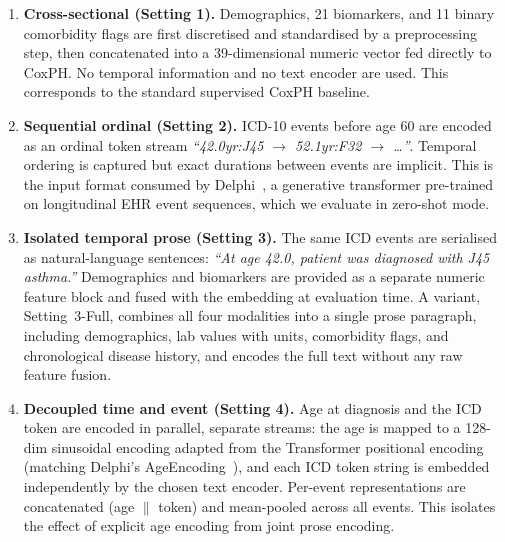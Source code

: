 \begin{enumerate}
  \item \textbf{Cross-sectional (Setting 1).}
        Demographics, 21 biomarkers, and 11 binary comorbidity flags are
        first discretised and standardised by a preprocessing step, then
        concatenated into a 39-dimensional numeric vector fed directly to CoxPH.
        No temporal information and no text encoder are used.
        This corresponds to the standard supervised CoxPH baseline.

  \item \textbf{Sequential ordinal (Setting 2).}
        ICD-10 events before age 60 are encoded as an ordinal token stream
        \textit{``42.0yr:J45 $\rightarrow$ 52.1yr:F32 $\rightarrow$ \ldots''}.
        Temporal ordering is captured but exact durations between events are
        implicit.
        This is the input format consumed by Delphi~\cite{delphi2024},
        a generative transformer pre-trained on longitudinal EHR event
        sequences, which we evaluate in zero-shot mode.

  \item \textbf{Isolated temporal prose (Setting 3).}
        The same ICD events are serialised as natural-language sentences:
        \textit{``At age 42.0, patient was diagnosed with J45 asthma.''}
        Demographics and biomarkers are provided as a separate numeric
        feature block and fused with the embedding at evaluation time.
        A variant, Setting~3-Full, combines all four modalities into a single
        prose paragraph, including demographics, lab values with units,
        comorbidity flags, and chronological disease history, and encodes the
        full text without any raw feature fusion.

  \item \textbf{Decoupled time and event (Setting 4).}
        Age at diagnosis and the ICD token are encoded in parallel, separate
        streams: the age is mapped to a 128-dim sinusoidal encoding adapted
        from the Transformer positional encoding~\cite{vaswani2017attention}
        (matching Delphi's AgeEncoding~\cite{delphi2024}), and each ICD token string is
        embedded independently by the chosen text encoder.
        Per-event representations are concatenated (age $\parallel$ token)
        and mean-pooled across all events.
        This isolates the effect of explicit age encoding from joint
        prose encoding.
\end{enumerate}

